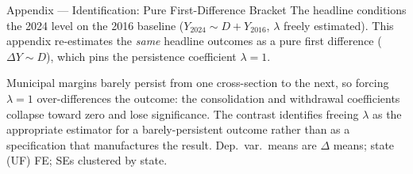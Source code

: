 
\begin{frame}{Appendix --- Identification: Pure First-Difference Bracket}
\hypertarget{app:fd}{}
\small
The headline conditions the 2024 level on the 2016 baseline ($Y_{2024}\sim D + Y_{2016}$, $\lambda$ freely estimated). This appendix re-estimates the \emph{same} headline outcomes as a pure first difference ($\Delta Y \sim D$), which pins the persistence coefficient $\lambda=1$.
\smallskip
\begin{center}
\scriptsize
\resizebox{\linewidth}{!}{}
\end{center}
\smallskip
\footnotesize Municipal margins barely persist from one cross-section to the next, so forcing $\lambda=1$ over-differences the outcome: the consolidation and withdrawal coefficients collapse toward zero and lose significance. The contrast identifies freeing $\lambda$ as the appropriate estimator for a barely-persistent outcome rather than as a specification that manufactures the result. Dep.\ var.\ means are $\Delta$ means; state (UF) FE; SEs clustered by state. \hfill\hyperlink{src:fd}{}
\end{frame}

